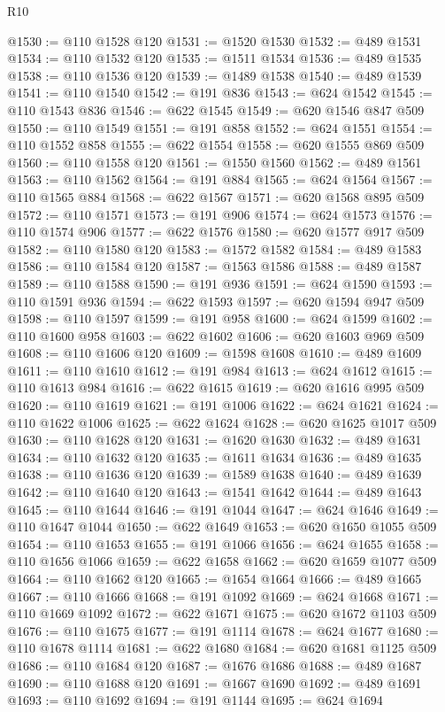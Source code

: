 \begin{lexlean}{R10}
\begin{coremodule}
@1530 := @110 @1528 @120
@1531 := @1520 @1530
@1532 := @489 @1531
@1534 := @110 @1532 @120
@1535 := @1511 @1534
@1536 := @489 @1535
@1538 := @110 @1536 @120
@1539 := @1489 @1538
@1540 := @489 @1539
@1541 := @110 @1540
@1542 := @191 @836
@1543 := @624 @1542
@1545 := @110 @1543 @836
@1546 := @622 @1545
@1549 := @620 @1546 @847 @509
@1550 := @110 @1549
@1551 := @191 @858
@1552 := @624 @1551
@1554 := @110 @1552 @858
@1555 := @622 @1554
@1558 := @620 @1555 @869 @509
@1560 := @110 @1558 @120
@1561 := @1550 @1560
@1562 := @489 @1561
@1563 := @110 @1562
@1564 := @191 @884
@1565 := @624 @1564
@1567 := @110 @1565 @884
@1568 := @622 @1567
@1571 := @620 @1568 @895 @509
@1572 := @110 @1571
@1573 := @191 @906
@1574 := @624 @1573
@1576 := @110 @1574 @906
@1577 := @622 @1576
@1580 := @620 @1577 @917 @509
@1582 := @110 @1580 @120
@1583 := @1572 @1582
@1584 := @489 @1583
@1586 := @110 @1584 @120
@1587 := @1563 @1586
@1588 := @489 @1587
@1589 := @110 @1588
@1590 := @191 @936
@1591 := @624 @1590
@1593 := @110 @1591 @936
@1594 := @622 @1593
@1597 := @620 @1594 @947 @509
@1598 := @110 @1597
@1599 := @191 @958
@1600 := @624 @1599
@1602 := @110 @1600 @958
@1603 := @622 @1602
@1606 := @620 @1603 @969 @509
@1608 := @110 @1606 @120
@1609 := @1598 @1608
@1610 := @489 @1609
@1611 := @110 @1610
@1612 := @191 @984
@1613 := @624 @1612
@1615 := @110 @1613 @984
@1616 := @622 @1615
@1619 := @620 @1616 @995 @509
@1620 := @110 @1619
@1621 := @191 @1006
@1622 := @624 @1621
@1624 := @110 @1622 @1006
@1625 := @622 @1624
@1628 := @620 @1625 @1017 @509
@1630 := @110 @1628 @120
@1631 := @1620 @1630
@1632 := @489 @1631
@1634 := @110 @1632 @120
@1635 := @1611 @1634
@1636 := @489 @1635
@1638 := @110 @1636 @120
@1639 := @1589 @1638
@1640 := @489 @1639
@1642 := @110 @1640 @120
@1643 := @1541 @1642
@1644 := @489 @1643
@1645 := @110 @1644
@1646 := @191 @1044
@1647 := @624 @1646
@1649 := @110 @1647 @1044
@1650 := @622 @1649
@1653 := @620 @1650 @1055 @509
@1654 := @110 @1653
@1655 := @191 @1066
@1656 := @624 @1655
@1658 := @110 @1656 @1066
@1659 := @622 @1658
@1662 := @620 @1659 @1077 @509
@1664 := @110 @1662 @120
@1665 := @1654 @1664
@1666 := @489 @1665
@1667 := @110 @1666
@1668 := @191 @1092
@1669 := @624 @1668
@1671 := @110 @1669 @1092
@1672 := @622 @1671
@1675 := @620 @1672 @1103 @509
@1676 := @110 @1675
@1677 := @191 @1114
@1678 := @624 @1677
@1680 := @110 @1678 @1114
@1681 := @622 @1680
@1684 := @620 @1681 @1125 @509
@1686 := @110 @1684 @120
@1687 := @1676 @1686
@1688 := @489 @1687
@1690 := @110 @1688 @120
@1691 := @1667 @1690
@1692 := @489 @1691
@1693 := @110 @1692
@1694 := @191 @1144
@1695 := @624 @1694

\end{coremodule}
\end{lexlean}

